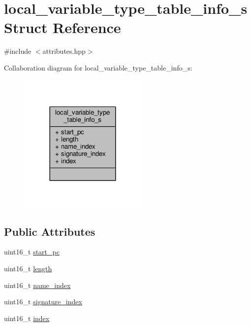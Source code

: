 \hypertarget{structlocal__variable__type__table__info__s}{\section{local\+\_\+variable\+\_\+type\+\_\+table\+\_\+info\+\_\+s Struct Reference}
\label{structlocal__variable__type__table__info__s}
}


{\ttfamily \#include $<$attributes.\+hpp$>$}



Collaboration diagram for local\+\_\+variable\+\_\+type\+\_\+table\+\_\+info\+\_\+s\+:\nopagebreak
\begin{figure}[H]
\begin{center}
\leavevmode
\includegraphics[width=180pt]{structlocal__variable__type__table__info__s__coll__graph}
\end{center}
\end{figure}
\subsection*{Public Attributes}
\begin{DoxyCompactItemize}
\item 
uint16\+\_\+t \hyperlink{structlocal__variable__type__table__info__s_a3c7eafcb1edc9ef0fb4c2f9f48b51847}{start\+\_\+pc}
\item 
uint16\+\_\+t \hyperlink{structlocal__variable__type__table__info__s_a3e805044284c5b623fa5f9309c5e2f1e}{length}
\item 
uint16\+\_\+t \hyperlink{structlocal__variable__type__table__info__s_a1b62a08acc670a50e13ef6f3d655d8a7}{name\+\_\+index}
\item 
uint16\+\_\+t \hyperlink{structlocal__variable__type__table__info__s_a7f6d34460cdca5324e648287fbfc64b3}{signature\+\_\+index}
\item 
uint16\+\_\+t \hyperlink{structlocal__variable__type__table__info__s_ae6348a5edac01de502e54a8dda41394d}{index}
\end{DoxyCompactItemize}


